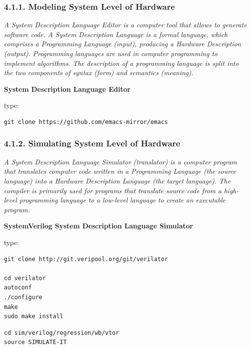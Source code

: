 \documentclass[
]{article}
\begin{document}
\hypertarget{modeling-system-level-of-hardware}{%
\subsubsection{4.1.1. Modeling System Level of
Hardware}\label{modeling-system-level-of-hardware}}

\emph{A System Description Language Editor is a computer tool that
allows to generate software code. A System Description Language is a
formal language, which comprises a Programming Language (input),
producing a Hardware Description (output). Programming languages are
used in computer programming to implement algorithms. The description of
a programming language is split into the two components of syntax (form)
and semantics (meaning).}

\textbf{System Description Language Editor}

type:

\begin{verbatim}
git clone https://github.com/emacs-mirror/emacs
\end{verbatim}

\hypertarget{simulating-system-level-of-hardware}{%
\subsubsection{4.1.2. Simulating System Level of
Hardware}\label{simulating-system-level-of-hardware}}

\emph{A System Description Language Simulator (translator) is a computer
program that translates computer code written in a Programming Language
(the source language) into a Hardware Description Language (the target
language). The compiler is primarily used for programs that translate
source code from a high-level programming language to a low-level
language to create an executable program.}

\textbf{SystemVerilog System Description Language Simulator}

type:

\begin{verbatim}
git clone http://git.veripool.org/git/verilator

cd verilator
autoconf
./configure
make
sudo make install
\end{verbatim}

\begin{verbatim}
cd sim/verilog/regression/wb/vtor
source SIMULATE-IT
\end{verbatim}
\end{document}
